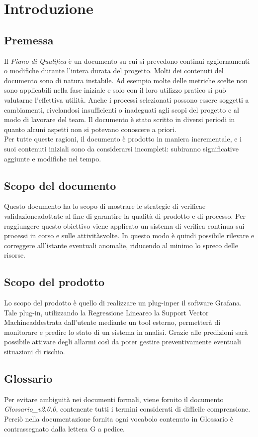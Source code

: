 \section{Introduzione}
\subsection{Premessa}
Il \textit{Piano di Qualifica} è un documento su cui si prevedono continui aggiornamenti o modifiche durante l'intera durata del progetto. Molti dei contenuti del documento sono di natura instabile. Ad esempio molte delle metriche scelte non sono applicabili nella fase iniziale e solo con il loro utilizzo pratico si può valutarne l'effettiva utilità. Anche i processi selezionati possono essere soggetti a cambiamenti, rivelandosi insufficienti o inadeguati agli scopi del progetto e al modo di lavorare del team. Il documento è stato scritto in diversi periodi in quanto alcuni aspetti non si potevano conoscere a priori. \\
Per tutte queste ragioni, il documento è prodotto in maniera incrementale\glo, e i suoi contenuti iniziali sono da considerarsi incompleti: subiranno significative aggiunte e modifiche nel tempo.

\subsection{Scopo del documento}
Questo documento ha lo scopo di mostrare le strategie di verifica\glo e validazione\glo adottate al fine di garantire la qualità di prodotto e di processo\glo. Per raggiungere questo obiettivo viene applicato un sistema di verifica continua sui processi in corso e sulle attività\glo svolte. In questo modo è quindi possibile rilevare e correggere all'istante eventuali anomalie, riducendo al minimo lo spreco delle risorse.

\subsection{Scopo del prodotto}
Lo scopo del prodotto è quello di realizzare un plug-in\glo per il software Grafana\glo. Tale plug-in, utilizzando la Regressione Lineare\glo o la Support Vector Machine\glo addestrata dall'utente mediante un tool esterno, permetterà di monitorare e predire lo stato di un sistema in analisi. Grazie alle predizioni sarà possibile attivare degli allarmi così da poter gestire preventivamente eventuali situazioni di rischio. 

\subsection{Glossario}
Per evitare ambiguità nei documenti formali, viene fornito il documento \textit{Glossario\_v2.0.0},
contenente tutti i termini considerati di difficile comprensione. Perciò nella documentazione fornita ogni vocabolo contenuto in Glossario è contrassegnato dalla lettera G a pedice.

